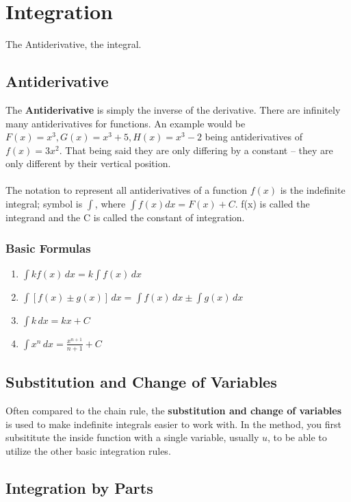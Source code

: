 \chapter{Integration}The Antiderivative, the integral.

\section{Antiderivative}
The \textbf{Antiderivative} is simply the inverse of the derivative. There are infinitely many antiderivatives for functions. An example would be $F(x) = x^3, G(x) = x^3+5, H(x) = x^3 - 2$ being antiderivatives of  $f(x) = 3x^2$. That being said they are only differing by a constant -- they are only different by their vertical position.\\
\\
The notation to represent all antiderivatives of a function $f(x)$ is the indefinite integral; symbol is $\int$, where $\int f(x)dx=F(x)+C$. f(x) is called the integrand and the C is called the constant of integration.

\subsection{Basic Formulas}
\begin{enumerate}
    \item $\int k f(x) \, dx = k \int f(x) \, dx$
    \item $\int [f(x) \pm g(x)] \, dx = \int f(x) \, dx \pm \int g(x) \, dx$
    \item $\int k \, dx = kx + C$
    \item $\int x^n \, dx = \frac{x^{n+1}}{n+1} + C$
\end{enumerate}

\section{Substitution and Change of Variables}
Often compared to the chain rule, the \textbf{substitution and change of variables} is used to make indefinite integrals easier to work with. In the method, you first subsititute the inside function with a single variable, usually $u$, to be able to utilize the other basic integration rules.

\section{Integration by Parts}


